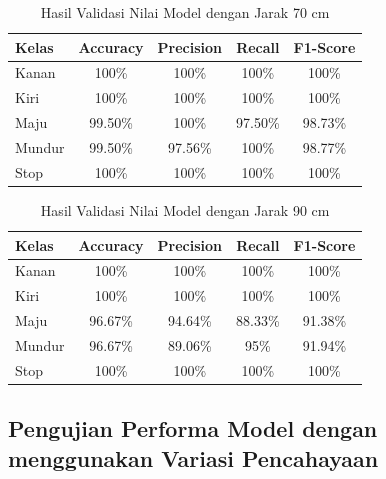 \begin{table}[ht]
  \caption{Hasil Validasi Nilai Model dengan Jarak 70 cm}
  \label{tb:70cm}
  \centering
  \begin{tabular}{|l|c|c|c|c|}
  \hline
  \rowcolor[HTML]{C0C0C0} 
  \textbf{Kelas} & \textbf{Accuracy} & \textbf{Precision} & \textbf{Recall} & \textbf{F1-Score} \\ \hline
  Kanan    & 100\%            & 100\%             & 100\%           & 100\%            \\ \hline
  Kiri     & 100\%          & 100\%           & 100\%           & 100\%           \\ \hline
  Maju      & 99.50\%          & 100\%           & 97.50\%          & 98.73\%          \\ \hline
  Mundur     & 99.50\%            & 97.56\%             & 100\%           & 98.77\%            \\ \hline
  Stop  & 100\%            & 100\%             & 100\%           & 100\%            \\ \hline
  \end{tabular}
\end{table}

\begin{table}[H]
  \caption{Hasil Validasi Nilai Model dengan Jarak 90 cm}
  \label{tb:90cm}
  \centering
  \begin{tabular}{|l|c|c|c|c|}
  \hline
  \rowcolor[HTML]{C0C0C0} 
  \textbf{Kelas} & \textbf{Accuracy} & \textbf{Precision} & \textbf{Recall} & \textbf{F1-Score} \\ \hline
  Kanan    & 100\%            & 100\%             & 100\%           & 100\%            \\ \hline
  Kiri     & 100\%          & 100\%           & 100\%           & 100\%           \\ \hline
  Maju      & 96.67\%          & 94.64\%           & 88.33\%          & 91.38\%          \\ \hline
  Mundur     & 96.67\%            & 89.06\%             & 95\%           & 91.94\%            \\ \hline
  Stop  & 100\%            & 100\%             & 100\%           & 100\%            \\ \hline
  \end{tabular}
\end{table}
    
\subsection{Pengujian Performa Model dengan menggunakan Variasi Pencahayaan}

